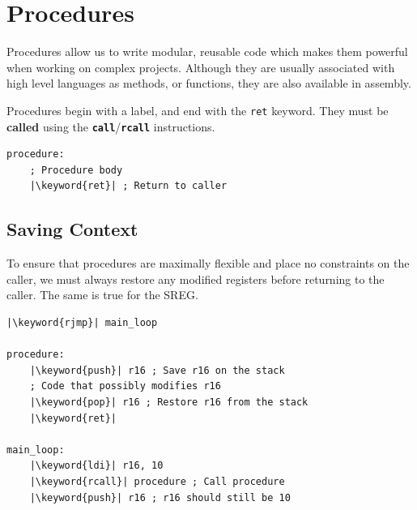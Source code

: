 \documentclass{report}
\newcommand{\keyword}[1]{\textcolor[rgb]{0.00,0.50,0.00}{\textbf{#1}}}
\newcommand{\keywordinline}[1]{\textcolor[rgb]{0.00,0.50,0.00}{\textbf{\texttt{#1}}}}
\begin{document}
\section{Procedures}
Procedures allow us to write modular, reusable code which makes them powerful when working on
complex projects. Although they are usually associated with high level languages as
methods, or functions, they are also available in assembly.

Procedures begin with a label, and end with the \texttt{ret} keyword.
They must be \textbf{called} using the \keywordinline{call}/\keywordinline{rcall} instructions.
\begin{verbatim}
procedure:
    ; Procedure body
    |\keyword{ret}| ; Return to caller
\end{verbatim}
\subsection{Saving Context}
To ensure that procedures are maximally flexible and place no constraints on the caller,
we must always restore any modified registers before returning to the caller. The same is
true for the SREG\@.
\begin{verbatim}
|\keyword{rjmp}| main_loop

procedure:
    |\keyword{push}| r16 ; Save r16 on the stack
    ; Code that possibly modifies r16
    |\keyword{pop}| r16 ; Restore r16 from the stack
    |\keyword{ret}|

main_loop:
    |\keyword{ldi}| r16, 10
    |\keyword{rcall}| procedure ; Call procedure
    |\keyword{push}| r16 ; r16 should still be 10
\end{verbatim}
\end{document}
